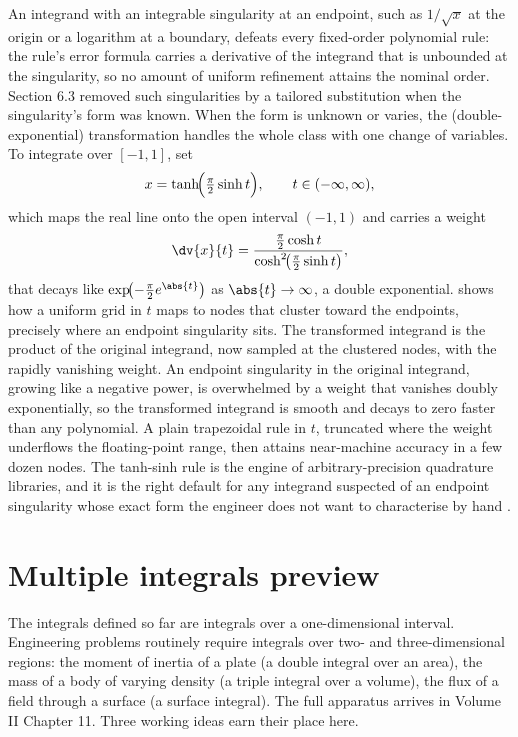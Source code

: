 An integrand with an integrable singularity at an endpoint, such as
$1/\sqrt{x}$ at the origin or a logarithm at a boundary, defeats every
fixed-order polynomial rule: the rule's error formula carries a
derivative of the integrand that is unbounded at the singularity, so no
amount of uniform refinement attains the nominal order. Section 6.3
removed such singularities by a tailored substitution when the
singularity's form was known. When the form is unknown or varies, the
 (double-exponential) transformation handles the
whole class with one change of variables. To integrate over $[-1, 1]$,
set
\[
x = \tanh\!\Bigl(\tfrac{\pi}{2}\sinh t\Bigr), \qquad t \in (-\infty,
\infty),
\]
which maps the real line onto the open interval $(-1, 1)$ and carries a
weight
\[
\dv{x}{t} = \frac{\tfrac{\pi}{2}\cosh t}{\cosh^{2}\!\bigl(\tfrac{\pi}
{2}\sinh t\bigr)},
\]
that decays like $\exp\!\bigl(-\tfrac{\pi}{2}e^{\abs{t}}\bigr)$ as
$\abs{t}\to\infty$, a double exponential.
 shows how a uniform grid in $t$ maps to
nodes that cluster toward the endpoints, precisely where an endpoint
singularity sits. The transformed integrand is the product of the
original integrand, now sampled at the clustered nodes, with the
rapidly vanishing weight. An endpoint singularity in the original
integrand, growing like a negative power, is overwhelmed by a weight
that vanishes doubly exponentially, so the transformed integrand is
smooth and decays to zero faster than any polynomial. A plain
trapezoidal rule in $t$, truncated where the weight underflows the
floating-point range, then attains near-machine accuracy in a few dozen
nodes. The tanh-sinh rule is the engine of arbitrary-precision
quadrature libraries, and it is the right default for any integrand
suspected of an endpoint singularity whose exact form the engineer does
not want to characterise by hand \cite{text:v2ch06-trefethen-spectral}.



\section{Multiple integrals preview}

The integrals defined so far are integrals over a one-dimensional
interval. Engineering problems routinely require integrals over
two- and three-dimensional regions: the moment of inertia of a
plate (a double integral over an area), the mass of a body of
varying density (a triple integral over a volume), the flux of a
field through a surface (a surface integral). The full apparatus
arrives in Volume II Chapter 11. Three working ideas earn their
place here.

